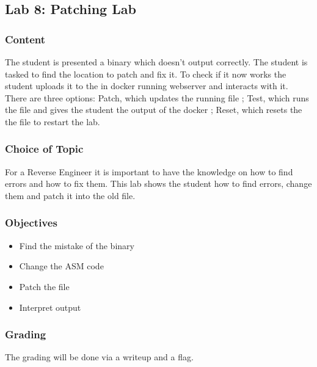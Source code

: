 \subsection{Lab 8: Patching Lab}
\subsubsection*{Content}
The student is presented a binary which doesn't output correctly. The student is tasked to find the location to patch and fix it. To check if it now works the student uploads it to the in docker running webserver and interacts with it. There are three options: Patch, which updates the running file ; Test, which runs the file and gives the student the output of the docker ; Reset, which resets the the file to restart the lab. 
\subsubsection*{Choice of Topic}
For a Reverse Engineer it is important to have the knowledge on how to find errors and how to fix them. This lab shows the student how to find errors, change them and patch it into the old file.
\subsubsection*{Objectives}
\begin{itemize}
    \item Find the mistake of the binary
    \item Change the ASM code
    \item Patch the file
    \item Interpret output
\end{itemize}
\subsubsection*{Grading}
The grading will be done via a writeup and a flag.
